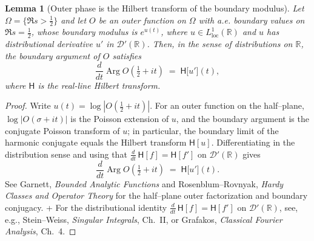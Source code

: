 \documentclass[11pt]{article}
\newtheorem{lemma}[theorem]{Lemma}
\theoremstyle{definition}
\theoremstyle{remark}
\newcommand{\R}{\mathbb{R}}
\DeclareMathOperator{\Arg}{Arg}
\begin{document}
\begin{lemma}[Outer phase is the Hilbert transform of the boundary modulus]\label{lem:outer-phase-HT}
Let \(\Omega=\{\Re s>\tfrac12\}\) and let \(O\) be an outer function on \(\Omega\) with a.e. boundary values on \(\Re s=\tfrac12\), whose boundary modulus is \(e^{u(t)}\), where \(u\in L^1_{\mathrm{loc}}(\R)\) and \(u\) has distributional derivative \(u'\) in \(\mathcal D'(\R)\). Then, in the sense of distributions on \(\R\), the boundary argument of \(O\) satisfies
\[
 \frac{d}{dt}\Arg O\!\left(\tfrac12+it\right)\;=\; \mathsf H\big[u'\big](t),
\]
where \(\mathsf H\) is the real-line Hilbert transform.
\end{lemma}
\begin{proof}
Write \(u(t)=\log|O(\tfrac12+it)|\). For an outer function on the half–plane, \(\log|O(\sigma+it)|\) is the Poisson extension of \(u\), and the boundary argument is the conjugate Poisson transform of \(u\); in particular, the boundary limit of the harmonic conjugate equals the Hilbert transform \(\mathsf H[u]\). Differentiating in the distribution sense and using that \(\tfrac{d}{dt}\,\mathsf H[f]=\mathsf H[f']\) on \(\mathcal D'(\R)\) gives
\[
 \frac{d}{dt}\Arg O\!\left(\tfrac12+it\right)\;=\; \mathsf H\big[u'\big](t).
\]
See Garnett, \emph{Bounded Analytic Functions} \cite[Ch.~II, §2 (Poisson integral), §5 (outer functions)]{Garnett} and Rosenblum–Rovnyak, \emph{Hardy Classes and Operator Theory} \cite[Ch.~2, §3]{RosenblumRovnyak} for the half–plane outer factorization and boundary conjugacy.
+ For the distributional identity $\tfrac{d}{dt}\,\mathsf H[f]=\mathsf H[f']$ on $\mathcal D'(\R)$, see, e.g., Stein–Weiss, \emph{Singular Integrals}, Ch.~II, or Grafakos, \emph{Classical Fourier Analysis}, Ch.~4.
\end{proof}
\end{document}
